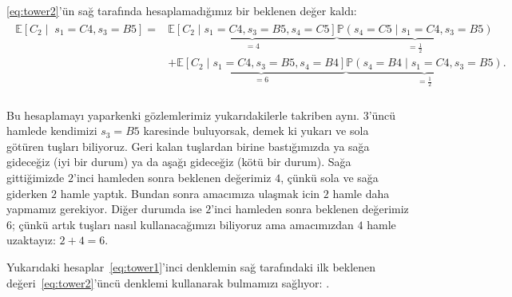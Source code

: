 \eqref{eq:tower2}'\"{u}n sa\u{g} taraf{\i}nda hesaplamad{\i}\u{g}{\i}m{\i}z bir beklenen de\u{g}er kald{\i}:
%
\begin{align*}
    \begin{split}
    \mathbb{E}[C_2 \mid \; s_1=C4, s_3=B5] =
    &\underbrace{\mathbb{E}[C_2 \mid s_1=C4, s_3=B5, s_4=C5]}_{=4} \underbrace{\mathbb{P}(s_4=C5 \mid s_1=C4, s_3=B5)}_{=\frac{1}{2}} \\
    &+ \underbrace{\mathbb{E}[C_2 \mid s_1=C4, s_3=B5, s_4=B4]}_{=6} \underbrace{\mathbb{P}(s_4=B4 \mid s_1=C4, s_3=B5)}_{=\frac{1}{2}}.
    \end{split}
\end{align*}
%
\hphantom{aha} \\[-3ex]
Bu hesaplamay{\i} yaparkenki g\"{o}zlemlerimiz yukar{\i}dakilerle takriben
ayn{\i}. $3$'\"{u}nc\"{u} hamlede kendimizi $s_3 = B5$ karesinde buluyorsak,
demek ki yukar{\i} ve sola g\"{o}t\"{u}ren tu\c{s}lar{\i} biliyoruz. Geri kalan
tu\c{s}lardan birine bast{\i}\u{g}{\i}m{\i}zda ya sa\u{g}a gidece\u{g}iz (iyi
bir durum) ya da a\c{s}a\u{g}{\i} gidece\u{g}iz (k\"{o}t\"{u} bir durum).
Sa\u{g}a gitti\u{g}imizde $2$'inci hamleden sonra beklenen de\u{g}erimiz $4$,
\c{c}\"{u}nk\"{u} sola ve sa\u{g}a giderken $2$ hamle yapt{\i}k. Bundan sonra
amac{\i}m{\i}za ula\c{s}mak icin $2$ hamle daha yapmam{\i}z gerekiyor. Di\u{g}er
durumda ise $2$'inci hamleden sonra beklenen de\u{g}erimiz $6$;
\c{c}\"{u}nk\"{u} art{\i}k tu\c{s}lar{\i} nas{\i}l kullanaca\u{g}{\i}m{\i}z{\i}
biliyoruz ama amac{\i}m{\i}zdan $4$ hamle uzaktay{\i}z: $2+4 = 6$.

Yukar{\i}daki hesaplar~\eqref{eq:tower1}'inci denklemin sa\u{g} taraf{\i}ndaki
ilk beklenen de\u{g}eri~\eqref{eq:tower2}'\"{u}nc\"{u} denklemi kullanarak
bulmam{\i}z{\i} sa\u{g}l{\i}yor: .

\vspace{-3mm}

